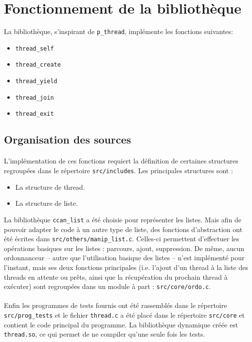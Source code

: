 \section{Fonctionnement de la bibliothèque}

 La bibliothèque, s'inspirant de \texttt{p\_thread}, implémente les
fonctions suivantes:
\begin{itemize}
  \item \texttt{thread\_self}
  \item \texttt{thread\_create}
  \item \texttt{thread\_yield}
  \item \texttt{thread\_join}
  \item \texttt{thread\_exit}
\end{itemize}

\subsection{Organisation des sources}

\paragraph{} L'implémentation de ces fonctions requiert la définition
de certaines structures regroupées dans le répertoire
\texttt{src/includes}. Les principales structures sont :
\begin{itemize}
\item La structure de thread.
\item La structure de liste.
\end{itemize} La bibliothèque \texttt{ccan\_list} a été choisie pour
représenter les listes. Mais afin de pouvoir adapter le code à un
autre type de liste, des fonctions d'abstraction ont été écrites dans
\texttt{src/others/manip\_list.c}. Celles-ci permettent d'effectuer
les opérations basiques sur les listes : parcours, ajout,
suppression. De même, aucun ordonnanceur -- autre que l'utilisation
basique des listes -- n'est implémenté pour l'instant, mais ses deux
fonctions principales (i.e. l'ajout d'un thread à la liste des threads
en attente ou prêts, ainsi que la récupération du prochain thread à
exécuter) sont regroupées dans un module à part :
\texttt{src/core/ordo.c}.
\paragraph{} Enfin les programmes de tests fournis ont été rassemblés
dans le répertoire \texttt{src/prog\_tests} et le fichier
\texttt{thread.c} a été placé dans le répertoire \texttt{src/core} et
contient le code principal du programme. La bibliothèque dynamique
créée est \texttt{thread.so}, ce qui permet de ne compiler qu'une
seule fois les tests.


